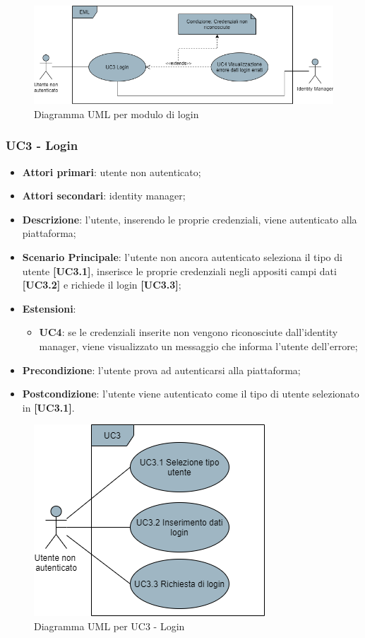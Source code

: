 \begin{figure}[H]
\centering
\includegraphics[scale=0.6]{res/UseCase/Immagini/Login}
\caption{Diagramma UML per modulo di login}
\end{figure}

\subsubsection{UC3 - Login}
\begin{itemize}
\item \textbf{Attori primari}: utente non autenticato;
\item \textbf{Attori secondari}: identity manager;
\item \textbf{Descrizione}: l'utente, inserendo le proprie credenziali, viene autenticato alla piattaforma;
\item \textbf{Scenario Principale}: l'utente non ancora autenticato seleziona il tipo di utente \textbf{[UC3.1]}, inserisce le proprie credenziali negli appositi campi dati \textbf{[UC3.2]} e richiede il login \textbf{[UC3.3]};
\item \textbf{Estensioni}:
\begin{itemize}
	\item \textbf{UC4}: se le credenziali inserite non vengono riconosciute dall'identity manager, viene visualizzato un messaggio che informa l'utente dell'errore;
\end{itemize}
\item \textbf{Precondizione}: l'utente prova ad autenticarsi alla piattaforma;
\item \textbf{Postcondizione}: l'utente viene autenticato come il tipo di utente selezionato in \textbf{[UC3.1]}.
\end{itemize}

\begin{figure}[H]
\centering
\includegraphics[scale=0.6]{res/UseCase/Immagini/LoginSottocasi}
\caption{Diagramma UML per UC3 - Login}
\end{figure}

